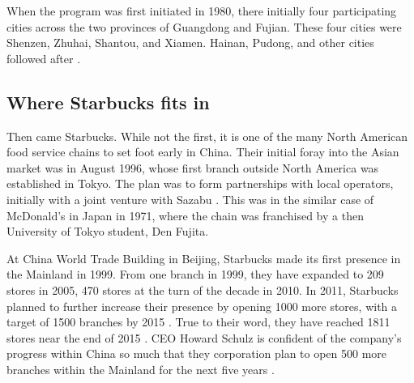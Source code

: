 When the program was first initiated in 1980, there initially four participating
cities across the two provinces of Guangdong and Fujian. These four cities were
Shenzen, Zhuhai, Shantou, and Xiamen. Hainan, Pudong, and other cities followed
after \autocite{jaggi_chinas_1996}. 


\subsection{Where Starbucks fits in}

Then came Starbucks. While not the first, it is one of the many North American
food service chains to set foot early in China. Their initial foray into the Asian
market was in August 1996, whose first branch outside North America was
established in Tokyo. The plan was to form partnerships with local operators,
initially with a joint venture with Sazabu \autocite{harrison_exporting_2005}.
This was in the similar case of McDonald's in Japan in 1971, where the chain was
franchised by a then University of Tokyo student, Den Fujita.
\autocite[21, 113]{watson_golden_2006}

At China World Trade Building in Beijing, Starbucks made its first presence in
the Mainland in 1999. From one branch in 1999, they have expanded to 209 stores
in 2005, 470 stores at the turn of the decade in 2010. In 2011, Starbucks
planned to further increase their presence by opening 1000 more stores, with a
target of 1500 branches by 2015 \autocite{_starbucks_2011}. True to their word,
they have reached 1811 stores near the end of 2015
\autocite{statista_starbucks_2015}. CEO Howard Schulz is confident of the
company's progress within China so much that they corporation plan to open 500
more branches within the Mainland for the next five years
\autocite{burkitt_starbucks_2016}.



